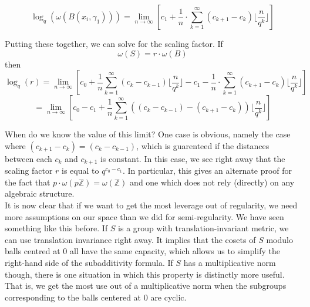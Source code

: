 \[\log_q(\omega(B(x_i,\gamma_1))) = \lim_{n\to\infty} [c_1 + \frac{1}{n}\cdot \sum_{k=1}^{\infty} (c_{k+1} - c_{k}) \lfloor \frac{n}{q^{k}}\rfloor]\]

Putting these together, we can solve for the scaling factor.
If \[\omega(S) = r\cdot \omega(B)\] then
\[ \log_q(r) = \lim_{n\to\infty} [c_0 + \frac{1}{n} \sum_{k=1}^\infty (c_k - c_{k-1}) \lfloor \frac{n}{q^k} \rfloor -  c_1 - \frac{1}{n}\cdot \sum_{k=1}^{\infty} (c_{k+1} - c_{k}) \lfloor \frac{n}{q^{k}}\rfloor]\]
\[ = \lim_{n\to\infty} [c_0 -c_1 + \frac{1}{n} \sum_{k=1}^\infty ((c_k - c_{k-1}) - (c_{k+1} - c_{k})) \lfloor \frac{n}{q^k} \rfloor] \]

When do we know the value of this limit? One case is obvious, namely the case where $(c_{k+1} - c_{k}) = (c_{k} - c_{k-1})$, which is guarenteed if the distances between each $c_k$ and $c_{k+1}$ is constant. In this case, we see right away that the scaling factor $r$ is equal to $q^{c_0-c_1}$. In particular, this gives an alternate proof for the fact that $p \cdot \omega(p\mathbb{Z}) = \omega(\mathbb{Z})$ and one which does not rely (directly) on any algebraic structure. \\

It is now clear that if we want to get the most leverage out of regularity, we need more assumptions on our space than we did for semi-regularity. We have seen something like this before. If $S$ is a group with translation-invariant metric, we can use translation invariance right away. It implies that the cosets of $S$ modulo balls centred at $0$ all have the same capacity, which allows us to simplify the right-hand side of the subadditivity formula. If $S$ has a multiplicative norm though, there is one situation in which this property is distinctly more useful. That is, we get the most use out of a multiplicative norm when the subgroups corresponding to the balls centered at $0$ are cyclic.\\%


